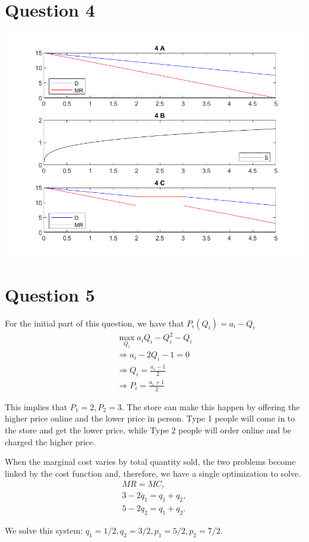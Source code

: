 \documentclass[11pt]{article} %
\begin{document}
\section{Question 4}
\includegraphics{q4}
\section{Question 5}
For the initial part of this question, we have that $P_i(Q_i) = a_i - Q_i$
\begin{align*}
\max_{Q_{i}} a_i Q_i -  Q_i^2 - Q_i\\
\Rightarrow a_i -2  Q_i - 1 = 0\\
\Rightarrow Q_i = \frac{a_i - 1}{2 }\\
\Rightarrow P_i = \frac{a_i + 1}{2}
\end{align*}

This implies that $P_1 = 2, P_2 = 3$. The store can make this happen by offering the higher price online and the lower price in person. Type 1 people will come in to the store and get the lower price, while Type 2 people will order online and be charged the higher price.

When the marginal cost varies by total quantity sold, the two problems become linked by the cost function and, therefore, we have a single optimization to solve.
\begin{align*}
MR=MC,\\
3 - 2q_1 = q_1 + q_2,\\
5 - 2q_2 = q_1 + q_2.
\end{align*}

We solve this system: $q_1 = 1/2,q_2 = 3/2, p_1 = 5/2, p_2 = 7/2$.
\end{document}
